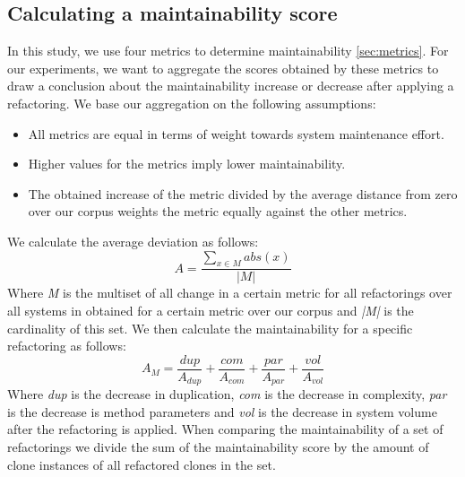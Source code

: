 \subsection{Calculating a maintainability score}\label{sec:metricformula}
In this study, we use four metrics to determine maintainability \ref{sec:metrics}. For our experiments, we want to aggregate the scores obtained by these metrics to draw a conclusion about the maintainability increase or decrease after applying a refactoring. We base our aggregation on the following assumptions:
\begin{itemize}
  \item All metrics are equal in terms of weight towards system maintenance effort.
  \item Higher values for the metrics imply lower maintainability.
  \item The obtained increase of the metric divided by the average distance from zero over our corpus weights the metric equally against the other metrics.
\end{itemize}
We calculate the average deviation as follows:
\begin{equation}\label{eq:scoredev}
A = \frac{\sum_{x \in M} abs(x)}{|M|}
\end{equation}
Where \textit{M} is the multiset of all change in a certain metric for all refactorings over all systems in  obtained for a certain metric over our corpus and \textit{|M|} is the cardinality of this set. We then calculate the maintainability for a specific refactoring as follows:
\begin{equation}\label{eq:scoreref}
A_M = \frac{dup}{A_{dup}} + \frac{com}{A_{com}} + \frac{par}{A_{par}} + \frac{vol}{A_{vol}}
\end{equation}
Where \textit{dup} is the decrease in duplication, \textit{com} is the decrease in complexity, \textit{par} is the decrease is method parameters and \textit{vol} is the decrease in system volume after the refactoring is applied. When comparing the maintainability of a set of refactorings we divide the sum of the maintainability score by the amount of clone instances of all refactored clones in the set.
